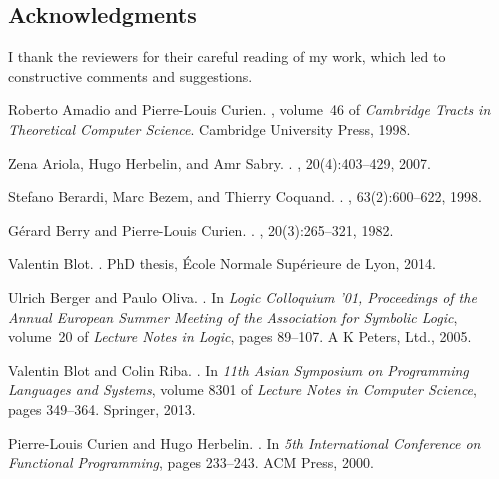 \documentclass{CSML}
\begin{document}
\subsection*{Acknowledgments}I thank the reviewers for their careful reading of my work, which led to constructive comments and suggestions.
\begin{thebibliography}{00000}

Roberto Amadio and Pierre-Louis Curien.
, volume~46 of {\em Cambridge
  Tracts in Theoretical Computer Science}.
\newblock Cambridge University Press, 1998.

Zena Ariola, Hugo Herbelin, and Amr Sabry.
.
, 20(4):403--429, 2007.

Stefano Berardi, Marc Bezem, and Thierry Coquand.
.
, 63(2):600--622, 1998.

G{\'e}rard Berry and Pierre-Louis Curien.
.
, 20(3):265--321, 1982.

Valentin Blot.
.
\newblock PhD thesis, \'Ecole Normale Sup\'erieure de Lyon, 2014.

Ulrich Berger and Paulo Oliva.
.
\newblock In {\em Logic Colloquium '01, Proceedings of the Annual European
  Summer Meeting of the Association for Symbolic Logic}, volume~20 of {\em
  Lecture Notes in Logic}, pages 89--107. A K Peters, Ltd., 2005.

Valentin Blot and Colin Riba.
.
\newblock In {\em 11th Asian Symposium on Programming Languages and Systems},
  volume 8301 of {\em Lecture Notes in Computer Science}, pages 349--364.
  Springer, 2013.

Pierre-Louis Curien and Hugo Herbelin.
.
\newblock In {\em 5th International Conference on Functional Programming},
  pages 233--243. {ACM} Press, 2000.


\end{thebibliography}
\end{document}
